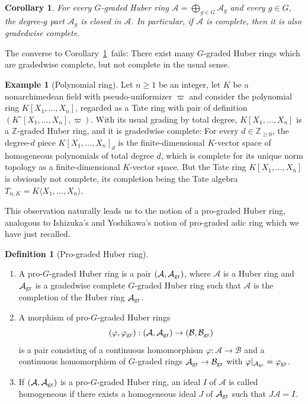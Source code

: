 \documentclass[12pt,twoside,a4paper]{article}
\newtheorem{cor}[thm]{Corollary}
\theoremstyle{definition}
\newtheorem{mydef}[thm]{Definition}
\newtheorem{example}[thm]{Example}
\theoremstyle{remark}
\newcommand\gr{{\rm gr}}
\begin{document}
\begin{cor}\label{Completeness}For every $G$-graded Huber ring $\mathcal{A}=\bigoplus_{g\in G}\mathcal{A}_{g}$ and every $g\in G$, the degree-$g$ part $\mathcal{A}_{g}$ is closed in $\mathcal{A}$. In particular, if $\mathcal{A}$ is complete, then it is also gradedwise complete. \end{cor}
The converse to Corollary~\ref{Completeness} fails: There exist many $G$-graded Huber rings which are gradedwise complete, but not complete in the usual sense. 
\begin{example}[Polynomial ring]\label{Polynomial ring}Let $n\geq1$ be an integer, let $K$ be a nonarchimedean field with pseudo-uniformizer $\varpi$ and consider the polynomial ring $K[X_1,\dots, X_n]$, regarded as a Tate ring with pair of definition $(K^{\circ}[X_1,\dots, X_n], \varpi)$. With its usual grading by total degree, $K[X_1,\dots, X_n]$ is a $\mathbb{Z}$-graded Huber ring, and it is gradedwise complete: For every $d\in \mathbb{Z}_{\geq0}$, the degree-$d$ piece $K[X_1,\dots, X_n]_{d}$ is the finite-dimensional $K$-vector space of homogeneous polynomials of total degree $d$, which is complete for its unique norm topology as a finite-dimensional $K$-vector space. But the Tate ring $K[X_1,\dots, X_n]$ is obviously not complete, its completion being the Tate algebra $T_{n, K}=K\langle X_1,\dots, X_n\rangle$. \end{example}
This observation naturally leads us to the notion of a pro-graded Huber ring, analogous to Ishizuka's and Yoshikawa's notion of pro-graded adic ring which we have just recalled.  
\begin{mydef}[Pro-graded Huber ring]\label{Pro-graded Huber ring}\begin{enumerate}[(1)]\item A pro-$G$-graded Huber ring is a pair $(\mathcal{A}, \mathcal{A}_{\gr})$, where $\mathcal{A}$ is a Huber ring and $\mathcal{A}_{\gr}$ is a gradedwise complete $G$-graded Huber ring such that $\mathcal{A}$ is the completion of the Huber ring $\mathcal{A}_{\gr}$. \item A morphism of pro-$G$-graded Huber rings \begin{equation*}(\varphi, \varphi_{\gr}): (\mathcal{A}, \mathcal{A}_{\gr})\to (\mathcal{B}, \mathcal{B}_{\gr})\end{equation*}is a pair consisting of a continuous homomorphism $\varphi: \mathcal{A}\to \mathcal{B}$ and a continuous homomorphism of $G$-graded rings $\mathcal{A}_{\gr}\to \mathcal{B}_{\gr}$ with $\varphi\vert_{\mathcal{A}_{\gr}}=\varphi_{\gr}$. \item If $(\mathcal{A}, \mathcal{A}_{\gr})$ is a pro-$G$-graded Huber ring, an ideal $I$ of $\mathcal{A}$ is called homogeneous if there exists a homogeneous ideal $J$ of $\mathcal{A}_{\gr}$ such that $J\mathcal{A}=I$.\end{enumerate}\end{mydef}
\end{document}
